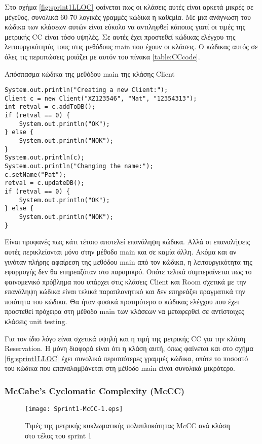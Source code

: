 Στο σχήμα \ref{fig:sprint1LLOC} φαίνεται πως οι κλάσεις αυτές είναι
αρκετά μικρές σε μέγεθος, συνολικά 60-70 λογικές γραμμές
κώδικα η καθεμία. Με μια ανάγνωση του κώδικα των κλάσεων αυτών είναι
εύκολο να αντιληφθεί κάποιος γιατί οι τιμές της μετρικής CC είναι τόσο
υψηλές. Σε αυτές έχει προστεθεί κώδικας ελέγχου της λειτουργικότητάς
τους στις μεθόδους main που έχουν οι κλάσεις. Ο κώδικας αυτός σε όλες
τις περιπτώσεις μοιάζει με αυτόν του πίνακα \ref{table:CCcode}.

\begin{table}
\caption{Απόσπασμα κώδικα της μεθόδου main της κλάσης Client}
\label{table:CCcode}
\begin{lstlisting}
System.out.println("Creating a new Client:");
Client c = new Client("XZ123546", "Mat", "12354313");
int retval = c.addToDB();
if (retval == 0) {
	System.out.println("OK");
} else {
	System.out.println("NOK");
}
System.out.println(c);
System.out.println("Changing the name:");
c.setName("Pat");
retval = c.updateDB();
if (retval == 0) {
	System.out.println("OK");
} else {
	System.out.println("NOK");
}
\end{lstlisting}
\end{table}

Είναι προφανές πως κάτι τέτοιο αποτελεί επανάληψη κώδικα. Αλλά οι επαναλήψεις
αυτές περικλείονται μόνο στην μέθοδο main και σε καμία άλλη. Ακόμα και
αν γινόταν πλήρης αφαίρεση της μεθόδου main από τον κώδικα, η
λειτουργικότητα της εφαρμογής δεν θα επηρεαζόταν στο παραμικρό. Οπότε
τελικά συμπεραίνεται πως το φαινομενικό πρόβλημα που υπάρχει στις
κλάσεις Client και Room σχετικά με την επανάληψη κώδικα είναι τελικά
παραπλανητικό και δεν επηρεάζει πραγματικά την ποιότητα του κώδικα. Θα
ήταν φυσικά προτιμότερο ο κώδικας ελέγχου που έχει προστεθεί πρόχειρα
στη μέθοδο main των κλάσεων να μεταφερθεί σε αντίστοιχες κλάσεις unit
testing.

Για τον ίδιο λόγο είναι σχετικά υψηλή και η τιμή της μετρικής CC για την
κλάση Reservation. Η μόνη διαφορά είναι ότι η κλάση αυτή, όπως φαίνεται
και στο σχήμα \ref{fig:sprint1LLOC} έχει συνολικά περισσότερες γραμμές
κώδικα, οπότε το ποσοστό του κώδικα που επαναλαμβάνεται στη μέθοδο main
είναι συνολικά μικρότερο.

\subsubsection{McCabe’s Cyclomatic Complexity (McCC)}
\label{section:sprint1McCC}


\begin{figure}
\centering
\texttt{[image: Sprint1-McCC-1.eps]}
\caption{Τιμές της μετρικής κυκλωματικής πολυπλοκότητας McCC ανά κλάση στο τέλος του sprint 1}
\label{fig:sprint1McCC}
\end{figure}

